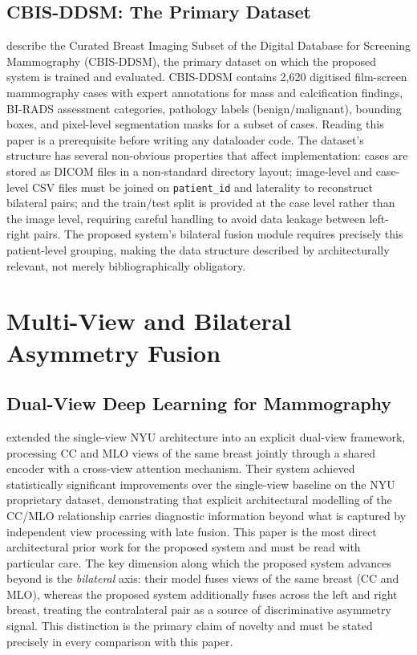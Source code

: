 \documentclass[12pt, a4paper]{article}
\begin{document}
\subsection{CBIS-DDSM: The Primary Dataset}

\textcite{Lee2017} describe the Curated Breast Imaging Subset of the Digital
Database for Screening Mammography (CBIS-DDSM), the primary dataset on which
the proposed system is trained and evaluated.
CBIS-DDSM contains 2,620 digitised film-screen mammography cases with expert
annotations for mass and calcification findings, BI-RADS assessment
categories, pathology labels (benign/malignant), bounding boxes, and
pixel-level segmentation masks for a subset of cases.
Reading this paper is a prerequisite before writing any dataloader code.
The dataset's structure has several non-obvious properties that affect
implementation: cases are stored as DICOM files in a non-standard directory
layout; image-level and case-level CSV files must be joined on
\texttt{patient\_id} and laterality to reconstruct bilateral pairs; and the
train/test split is provided at the case level rather than the image level,
requiring careful handling to avoid data leakage between left-right pairs.
The proposed system's bilateral fusion module requires precisely this
patient-level grouping, making the data structure described by
\textcite{Lee2017} architecturally relevant, not merely bibliographically
obligatory.

\section{Multi-View and Bilateral Asymmetry Fusion}

\subsection{Dual-View Deep Learning for Mammography}

\textcite{Wu2020} extended the single-view NYU architecture into an explicit
dual-view framework, processing CC and MLO views of the same breast jointly
through a shared encoder with a cross-view attention mechanism.
Their system achieved statistically significant improvements over the
single-view baseline on the NYU proprietary dataset, demonstrating that
explicit architectural modelling of the CC/MLO relationship carries
diagnostic information beyond what is captured by independent view processing
with late fusion.
This paper is the most direct architectural prior work for the proposed system
and must be read with particular care.
The key dimension along which the proposed system advances beyond
\textcite{Wu2020} is the \textit{bilateral} axis: their model fuses
views of the same breast (CC and MLO), whereas the proposed system
additionally fuses across the left and right breast, treating the
contralateral pair as a source of discriminative asymmetry signal.
This distinction is the primary claim of novelty and must be stated
precisely in every comparison with this paper.
\end{document}
